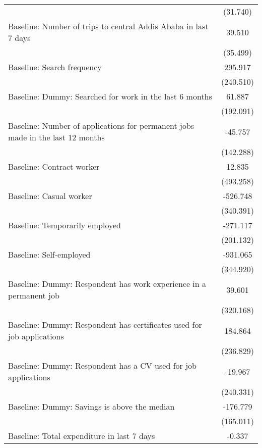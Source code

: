 {\begin{tabular*}{1in}{@{\hskip\tabcolsep\extracolsep\fill}l*{1}{c}}
                    &    (31.740)         \\
[1em]
Baseline: Number of trips to central Addis Ababa in last 7 days&      39.510         \\
                    &    (35.499)         \\
[1em]
Baseline: Search frequency&     295.917         \\
                    &   (240.510)         \\
[1em]
Baseline: Dummy: Searched for work in the last 6 months&      61.887         \\
                    &   (192.091)         \\
[1em]
Baseline: Number of applications for permanent jobs made in the last 12 months&     -45.757         \\
                    &   (142.288)         \\
[1em]
Baseline: Contract worker&      12.835         \\
                    &   (493.258)         \\
[1em]
Baseline: Casual worker&    -526.748         \\
                    &   (340.391)         \\
[1em]
Baseline: Temporarily employed&    -271.117         \\
                    &   (201.132)         \\
[1em]
Baseline: Self-employed&    -931.065         \\
                    &   (344.920)\sym{***}\\
[1em]
Baseline: Dummy: Respondent has work experience in a permanent job&      39.601         \\
                    &   (320.168)         \\
[1em]
Baseline: Dummy: Respondent has certificates used for job applications&     184.864         \\
                    &   (236.829)         \\
[1em]
Baseline: Dummy: Respondent has a CV used for job applications&     -19.967         \\
                    &   (240.331)         \\
[1em]
Baseline: Dummy: Savings is above the median&    -176.779         \\
                    &   (165.011)         \\
[1em]
Baseline: Total expenditure in last 7 days&      -0.337         \\

\end{tabular*}}
